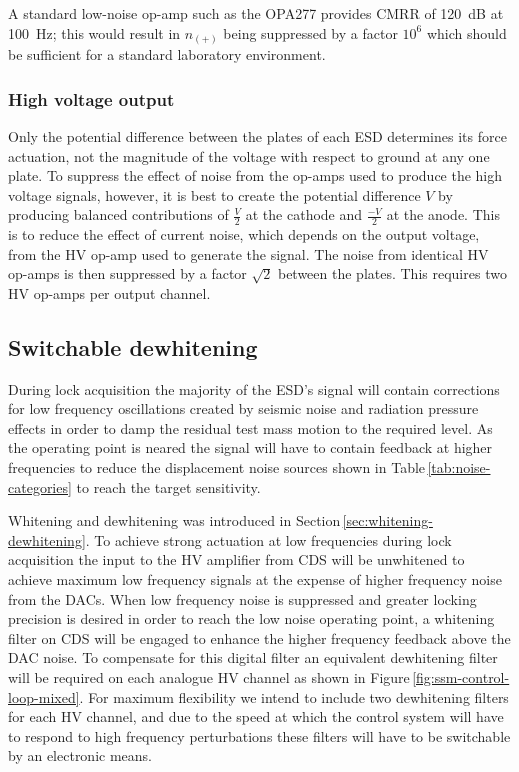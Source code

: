 A standard low-noise op-amp such as the OPA277 provides \gls{CMRR} of \SI{120}{\deci\bel} at \SI{100}{\hertz}; this would result in $n_{\left(+\right)}$ being suppressed by a factor $10^6$ which should be sufficient for a standard laboratory environment.

\subsubsection{High voltage output}
Only the potential difference between the plates of each \gls{ESD} determines its force actuation, not the magnitude of the voltage with respect to ground at any one plate. To suppress the effect of noise from the op-amps used to produce the high voltage signals, however, it is best to create the potential difference $V$ by producing balanced contributions of $\frac{V}{2}$ at the cathode and $\frac{-V}{2}$ at the anode. This is to reduce the effect of current noise, which depends on the output voltage, from the \gls{HV} op-amp used to generate the signal. The noise from identical \gls{HV} op-amps is then suppressed by a factor $\sqrt{2}$ between the plates. This requires two \gls{HV} op-amps per output channel.

\subsection{Switchable dewhitening}
During lock acquisition the majority of the \gls{ESD}'s signal will contain corrections for low frequency oscillations created by seismic noise and radiation pressure effects in order to damp the residual test mass motion to the required level. As the operating point is neared the signal will have to contain feedback at higher frequencies to reduce the displacement noise sources shown in Table\,\ref{tab:noise-categories} to reach the target sensitivity.

Whitening and dewhitening was introduced in Section\,\ref{sec:whitening-dewhitening}. To achieve strong actuation at low frequencies during lock acquisition the input to the \gls{HV} amplifier from \gls{CDS} will be unwhitened to achieve maximum low frequency signals at the expense of higher frequency noise from the \glspl{DAC}. When low frequency noise is suppressed and greater locking precision is desired in order to reach the low noise operating point, a whitening filter on \gls{CDS} will be engaged to enhance the higher frequency feedback above the \gls{DAC} noise. To compensate for this digital filter an equivalent dewhitening filter will be required on each analogue \gls{HV} channel as shown in Figure\,\ref{fig:ssm-control-loop-mixed}. For maximum flexibility we intend to include two dewhitening filters for each \gls{HV} channel, and due to the speed at which the control system will have to respond to high frequency perturbations these filters will have to be switchable by an electronic means.

